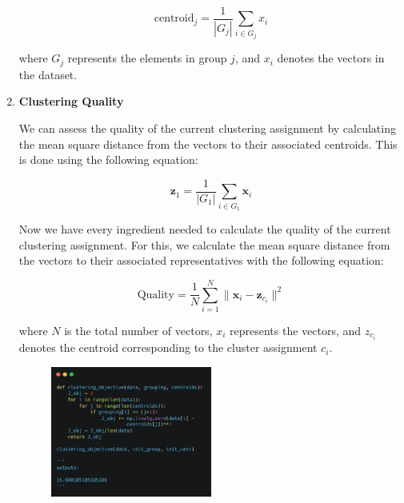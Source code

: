 \documentclass[12pt, a4paper]{article}
\begin{document}
\begin{flushleft}
\begin{flushleft}
\begin{enumerate}
\begin{flushleft}
        \[
        \text{{centroid}}_j = \frac{1}{{|G_j|}} \sum_{i \in G_j} x_i
        \]

        where $G_j$ represents the elements in group $j$, and $x_i$ denotes the vectors in the dataset.
        \end{flushleft}

        \item\textbf{Clustering Quality}
        \begin{flushleft}
            We can assess the quality of the current clustering assignment by calculating the mean square distance from the vectors to their associated centroids. This is done using the following equation:

            \[
            \mathbf{z}_1 = \frac{1}{|G_1|} \sum_{i \in G_1} \mathbf{x}_i
            \]

            Now we have every ingredient needed to calculate the quality of the current clustering assignment. For this, we calculate the mean square distance from the vectors to their associated representatives with the following equation:

            \[
            \text{Quality} = \frac{1}{N} \sum_{i=1}^{N} \|\mathbf{x}_i - \mathbf{z}_{c_i}\|^2
            \]

            where $N$ is the total number of vectors, $x_i$ represents the vectors, and $z_{c_i}$ denotes the centroid corresponding to the cluster assignment $c_i$.

            \begin{figure}[h]
            \centering
            \includegraphics[width=0.5\textwidth]{root_mean_calc.png}
            \end{figure}
           
        \end{flushleft}
        \end{enumerate} 


\end{flushleft}
\end{flushleft}
\end{document}
